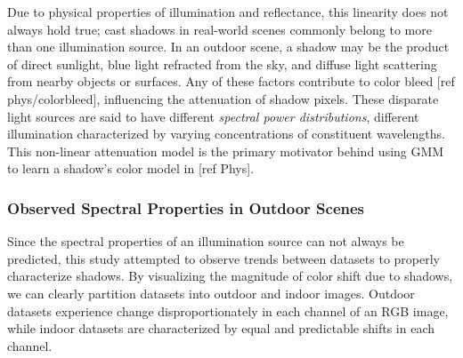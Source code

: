\documentclass[12pt]{report}
\begin{document}
Due to physical properties of illumination and reflectance, this linearity does not always hold true; cast shadows in real-world scenes commonly belong to more than one illumination source. In an outdoor scene, a shadow may be the product of direct sunlight, blue light refracted from the sky, and diffuse light scattering from nearby objects or surfaces. Any of these factors contribute to color bleed [ref phys/colorbleed], influencing the attenuation of shadow pixels. These disparate light sources are said to have different \textit{spectral power distributions}, different illumination characterized by varying concentrations of constituent wavelengths. This non-linear attenuation model is the primary motivator behind using GMM to learn a shadow's color model in [ref Phys].

\subsubsection{Observed Spectral Properties in Outdoor Scenes}

Since the spectral properties of an illumination source can not always be predicted, this study attempted to observe trends between datasets to properly characterize shadows. By visualizing the magnitude of color shift due to shadows, we can clearly partition datasets into outdoor and indoor images. Outdoor datasets experience change disproportionately in each channel of an RGB image, while indoor datasets are characterized by equal and predictable shifts in each channel.
\end{document}
